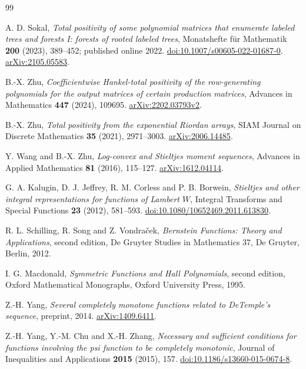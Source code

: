 \documentclass[11pt,a4paper]{article}
\theoremstyle{definition}
\theoremstyle{remark}
\numberwithin{equation}{section}
\begin{document}
\begin{thebibliography}{99}

A. D. Sokal,
\emph{Total positivity of some polynomial matrices that enumerate labeled
trees and forests I: forests of rooted labeled trees},
Monatshefte f\"ur Mathematik \textbf{200} (2023), 389--452;
published online 2022.
\href{https://doi.org/10.1007/s00605-022-01687-0}{doi:10.1007/s00605-022-01687-0}.
\href{https://arxiv.org/abs/2105.05583}{arXiv:2105.05583}.

B.-X. Zhu,
\emph{Coefficientwise Hankel-total positivity of the row-generating
polynomials for the output matrices of certain production matrices},
Advances in Mathematics \textbf{447} (2024), 109695.
\href{https://arxiv.org/abs/2202.03793v2}{arXiv:2202.03793v2}.

B.-X. Zhu,
\emph{Total positivity from the exponential Riordan arrays},
SIAM Journal on Discrete Mathematics \textbf{35} (2021), 2971--3003.
\href{https://arxiv.org/abs/2006.14485}{arXiv:2006.14485}.

Y. Wang and B.-X. Zhu,
\emph{Log-convex and Stieltjes moment sequences},
Advances in Applied Mathematics \textbf{81} (2016), 115--127.
\href{https://arxiv.org/abs/1612.04114}{arXiv:1612.04114}.

G. A. Kalugin, D. J. Jeffrey, R. M. Corless and P. B. Borwein,
\emph{Stieltjes and other integral representations for functions of Lambert
$W$}, Integral Transforms and Special Functions \textbf{23} (2012), 581--593.
\href{https://doi.org/10.1080/10652469.2011.613830}{doi:10.1080/10652469.2011.613830}.

R. L. Schilling, R. Song and Z. Vondra\v{c}ek,
\emph{Bernstein Functions: Theory and Applications}, second edition,
De Gruyter Studies in Mathematics 37, De Gruyter, Berlin, 2012.

I. G. Macdonald,
\emph{Symmetric Functions and Hall Polynomials}, second edition,
Oxford Mathematical Monographs, Oxford University Press, 1995.

Z.-H. Yang,
\emph{Several completely monotone functions related to DeTemple's sequence},
preprint, 2014.
\href{https://arxiv.org/abs/1409.6411}{arXiv:1409.6411}.

Z.-H. Yang, Y.-M. Chu and X.-H. Zhang,
\emph{Necessary and sufficient conditions for functions involving the psi
function to be completely monotonic},
Journal of Inequalities and Applications \textbf{2015} (2015), 157.
\href{https://doi.org/10.1186/s13660-015-0674-8}{doi:10.1186/s13660-015-0674-8}.


\end{thebibliography}
\end{document}
